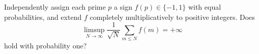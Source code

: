 Independently assign each prime $p$ a sign $f(p)\in\{-1,1\}$ with equal probabilities, and extend $f$ completely multiplicatively to positive integers. Does
\[
\limsup_{N\to\infty}\frac{1}{\sqrt N}\sum_{m\leq N}f(m)=+\infty
\]
hold with probability one?
